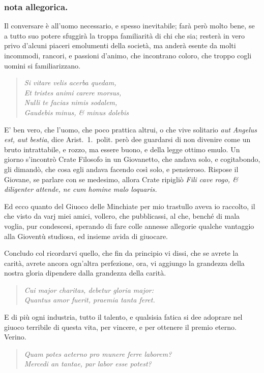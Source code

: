 \documentclass[11pt,a6paper]{article}
\newcommand{\literaryquote}[1]{%
\kern -6pt  \begin{verse}
    {\footnotesize \it #1}
  \end{verse}\kern -2pt%
}
\begin{document}
\subsubsection{nota allegorica.}
{\footnotesize
Il conversare è all'uomo necessario, e spesso
inevitabile; farà però molto bene, se a tutto suo
potere sfuggirà la troppa familiarità di chi che sia;
resterà in vero privo d'alcuni piaceri emolumenti
della società, ma anderà esente da molti incommodi,
rancori, e passioni d'animo, che incontrano
coloro, che troppo cogli uomini si familiarizzano.
\literaryquote{Si vitare velis acerba quedam,\\
Et tristes animi carere morsus,\\
Nulli te facias nimis sodalem,\\
Gaudebis minus, \& minus dolebis}

E' ben vero, che l'uomo, che poco prattica altrui,
o che vive solitario \textit{aut Angelus est, aut bestia},
dice Arist.\ 1.\ polit. però dee guardarsi di non
divenire come un bruto intrattabile, e rozzo, ma essere
buono, e della legge ottimo emulo. Un giorno
s'incontrò Crate Filosofo in un Giovanetto, che andava
solo, e cogitabondo, gli dimandò, che cosa
egli andava facendo così solo, e pensieroso.
Rispose il Giovane, se parlare con se medesimo, allora
Crate ripigliò \textit{Fili cave rogo, \& diligenter
 attende, ne cum homine malo loquaris.}
}

Ed ecco quanto del Giuoco delle Minchiate
per mio trastullo aveva io raccolto, il che visto da
varj miei amici, vollero, che pubblicassi, al che,
benché di mala voglia, pur condescesi, sperando di
fare colle annesse allegorie qualche vantaggio alla
Gioventù studiosa, ed insieme avida di giuocare.

Concludo col ricordarvi quello, che fin
da principio vi dissi, che se avrete la carità,
avrete ancora ogn'altra perfezione, ora,
vi aggiungo la grandezza della nostra gloria
dipendere dalla grandezza della carità.
\literaryquote{Cui major charitas, debetur gloria major:\\
 Quantus amor fuerit, praemia tanta feret.}

E di più ogni industria, tutto il talento, e
qualsisia fatica si dee adoprare nel giuoco
terribile di questa vita, per vincere, e per
ottenere il premio eterno. Verino.
\literaryquote{Quam potes aeterno pro munere ferre laborem?\\
Mercedi an tantae, par labor esse potest?}
\end{document}
